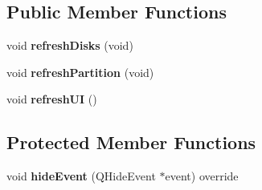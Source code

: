 \subsection*{Public Member Functions}
\begin{DoxyCompactItemize}
\item 
\mbox{\label{class_main_window_a770edeeb1dca0d8365f28ded5ac8c1a7}} 
void {\bfseries refresh\+Disks} (void)
\item 
\mbox{\label{class_main_window_a1e20191c2f6cecf881ed3a4de6147e12}} 
void {\bfseries refresh\+Partition} (void)
\item 
\mbox{\label{class_main_window_a8f650e410a52c007fbc62e13b09cceef}} 
void {\bfseries refresh\+UI} ()
\end{DoxyCompactItemize}
\subsection*{Protected Member Functions}
\begin{DoxyCompactItemize}
\item 
\mbox{\label{class_main_window_a5721fc9aa7fcc5727e137c8f4264db24}} 
void {\bfseries hide\+Event} (Q\+Hide\+Event $\ast$event) override
\end{DoxyCompactItemize}
